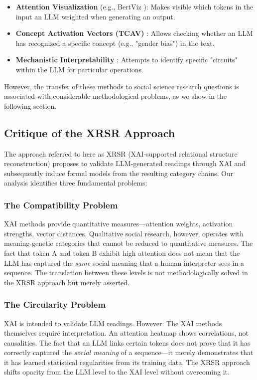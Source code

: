 \documentclass[12pt,a4paper]{article}
\begin{document}
\begin{itemize}
    \item \textbf{Attention Visualization} (e.g., BertViz \cite{vig2019visualizing}): Makes visible which tokens in the input an LLM weighted when generating an output.
    \item \textbf{Concept Activation Vectors (TCAV)} \cite{kim2018interpretability}: Allows checking whether an LLM has recognized a specific concept (e.g., "gender bias") in the text.
    \item \textbf{Mechanistic Interpretability} \cite{elhage2021mathematical}: Attempts to identify specific "circuits" within the LLM for particular operations.
\end{itemize}

However, the transfer of these methods to social science research questions is associated with considerable methodological problems, as we show in the following section.

\subsection{Critique of the XRSR Approach}

The approach referred to here as XRSR (XAI-supported relational structure reconstruction) proposes to validate LLM-generated readings through XAI and subsequently induce formal models from the resulting category chains. Our analysis identifies three fundamental problems:

\subsubsection{The Compatibility Problem}

XAI methods provide quantitative measures—attention weights, activation strengths, vector distances. Qualitative social research, however, operates with meaning-genetic categories that cannot be reduced to quantitative measures. The fact that token A and token B exhibit high attention does not mean that the LLM has captured the \textit{same} social meaning that a human interpreter sees in a sequence. The translation between these levels is not methodologically solved in the XRSR approach but merely asserted.

\subsubsection{The Circularity Problem}

XAI is intended to validate LLM readings. However: The XAI methods themselves require interpretation. An attention heatmap shows correlations, not causalities. The fact that an LLM links certain tokens does not prove that it has correctly captured the \textit{social meaning} of a sequence—it merely demonstrates that it has learned statistical regularities from its training data. The XRSR approach shifts opacity from the LLM level to the XAI level without overcoming it.
\end{document}
